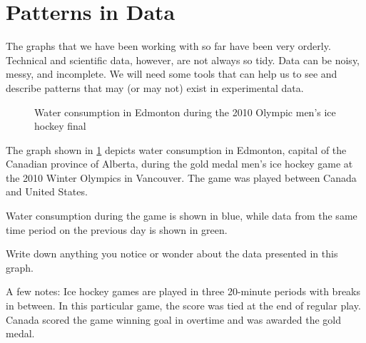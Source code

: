 \section{Patterns in Data}
\label{sec:patternsindata}

The graphs that we have been working with so far have been very orderly. Technical and scientific data, however, are not always so tidy. Data can be noisy, messy, and incomplete. We will need some tools that can help us to see and describe patterns that may (or may not) exist in experimental data.

\begin{figure}[!htbp]
	\centering
	{\color{black!25}}
	\caption{Water consumption in Edmonton during the 2010 Olympic men's ice hockey final}
	\label{fig:waterhockey}
\end{figure}

\begin{boxedexplore}
The graph shown in \cref{fig:waterhockey} depicts water consumption in Edmonton, capital of the Canadian province of Alberta, during the gold medal men's ice hockey game at the 2010 Winter Olympics in Vancouver. The game was played between Canada and United States.

Water consumption during the game is shown in blue, while data from the same time period on the previous day is shown in green.

Write down anything you notice or wonder about the data presented in this graph.

A few notes: Ice hockey games are played in three 20-minute periods with breaks in between. In this particular game, the score was tied at the end of regular play. Canada scored the game winning goal in overtime and was awarded the gold medal.
\end{boxedexplore}

